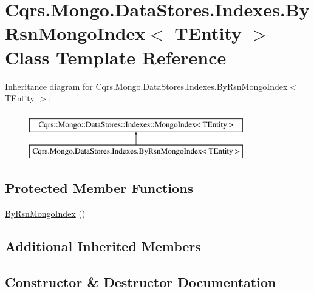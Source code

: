 \hypertarget{classCqrs_1_1Mongo_1_1DataStores_1_1Indexes_1_1ByRsnMongoIndex}{}\section{Cqrs.\+Mongo.\+Data\+Stores.\+Indexes.\+By\+Rsn\+Mongo\+Index$<$ T\+Entity $>$ Class Template Reference}
\label{classCqrs_1_1Mongo_1_1DataStores_1_1Indexes_1_1ByRsnMongoIndex}
Inheritance diagram for Cqrs.\+Mongo.\+Data\+Stores.\+Indexes.\+By\+Rsn\+Mongo\+Index$<$ T\+Entity $>$\+:\begin{figure}[H]
\begin{center}
\leavevmode
\includegraphics[height=2.000000cm]{classCqrs_1_1Mongo_1_1DataStores_1_1Indexes_1_1ByRsnMongoIndex}
\end{center}
\end{figure}
\subsection*{Protected Member Functions}
\begin{DoxyCompactItemize}
\item 
\hyperlink{classCqrs_1_1Mongo_1_1DataStores_1_1Indexes_1_1ByRsnMongoIndex_ae28ab1125093922dc3eeb3a19b821224_ae28ab1125093922dc3eeb3a19b821224}{By\+Rsn\+Mongo\+Index} ()
\end{DoxyCompactItemize}
\subsection*{Additional Inherited Members}


\subsection{Constructor \& Destructor Documentation}
\mbox{\label{classCqrs_1_1Mongo_1_1DataStores_1_1Indexes_1_1ByRsnMongoIndex_ae28ab1125093922dc3eeb3a19b821224_ae28ab1125093922dc3eeb3a19b821224}} 
